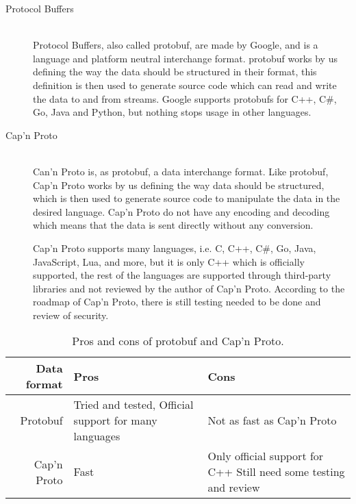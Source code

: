 \begin{description}

    \item[Protocol Buffers] \hfill\\
Protocol Buffers, also called protobuf, are made by Google, and is a language and platform neutral interchange format.
protobuf works by us defining the way the data should be structured in their format, this definition is then used to generate source code which can read and write the data to and from streams.\cite{protobuf}
Google supports protobufs for C++, C\#, Go, Java and Python, but nothing stops usage in other languages\cite{protobuf}.

\item[Cap'n Proto] \hfill\\
Can'n Proto is, as protobuf, a data interchange format.
Like protobuf, Cap'n Proto works by us defining the way data should be structured, which is then used to generate source code to manipulate the data in the desired language\cite{capnproto_schema}.
Cap'n Proto do not have any encoding and decoding which means that the data is sent directly without any conversion\cite{capnproto}.

Cap'n Proto supports many languages, i.e. C, C++, C\#, Go, Java, JavaScript, Lua, and more,
but it is only C++ which is officially supported,
the rest of the languages are supported through third-party libraries and not reviewed by the author of Cap'n Proto\cite{capnproto_langs}.
According to the roadmap of Cap'n Proto, there is still testing needed to be done and review of security\cite{capnproto_roadmap}.
\end{description}

\begin{table}
    \setlength{\tabcolsep}{10pt}
    \centering
    \begin{tabularx}{0.9\textwidth}{rXX}\toprule
        Data format & Pros                              & Cons \\\midrule
        Protobuf    & Tried and tested, \newline Official support for many languages & Not as fast as Cap'n Proto \\
        Cap'n Proto & Fast                              & Only official support for C++ \newline Still need some testing and review \\
    \end{tabularx}
    \caption{Pros and cons of protobuf and Cap'n Proto.}\label{tab:format_pros_cons}
\end{table}

